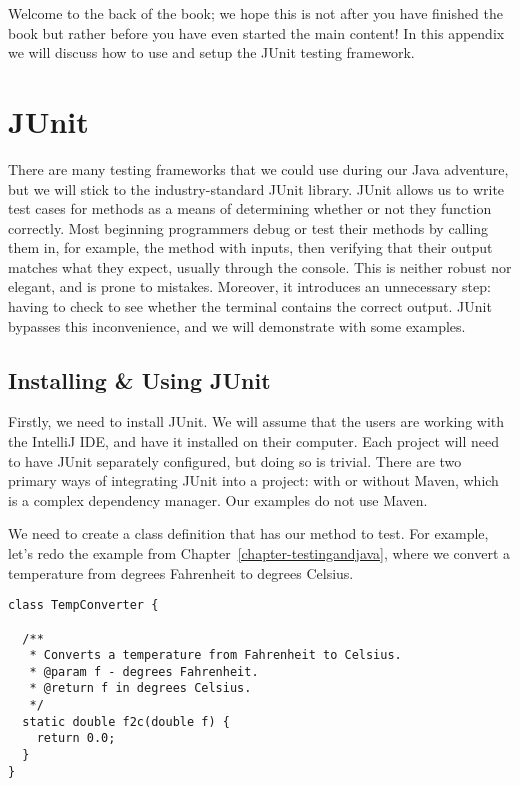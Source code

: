 Welcome to the back of the book; we hope this is not after you have finished the book but rather before you have even started the main content! In this appendix we will discuss how to use and setup the JUnit testing framework.

\section{JUnit}

There are many testing frameworks that we could use during our Java adventure, but we will stick to the industry-standard JUnit library. JUnit allows us to write test cases for methods as a means of determining whether or not they function correctly. Most beginning programmers debug or test their methods by calling them in, for example, the  method with inputs, then verifying that their output matches what they expect, usually through the console. This is neither robust nor elegant, and is prone to mistakes. Moreover, it introduces an unnecessary step: having to check to see whether the terminal contains the correct output. JUnit bypasses this inconvenience, and we will demonstrate with some examples.

\subsection{Installing \& Using JUnit}

Firstly, we need to install JUnit. We will assume that the users are working with the IntelliJ IDE, and have it installed on their computer. Each project will need to have JUnit separately configured, but doing so is trivial. There are two primary ways of integrating JUnit into a project: with or without Maven, which is a complex dependency manager. Our examples do not use Maven.

We need to create a class definition that has our method to test. For example, let's redo the example from Chapter~\ref{chapter-testingandjava}, where we convert a temperature from degrees Fahrenheit to degrees Celsius.

\begin{cl}[]{}
\begin{lstlisting}[language=MyJava]
class TempConverter {

  /**
   * Converts a temperature from Fahrenheit to Celsius.
   * @param f - degrees Fahrenheit.
   * @return f in degrees Celsius.
   */
  static double f2c(double f) {
    return 0.0;
  }
}
\end{lstlisting}
\end{cl}

